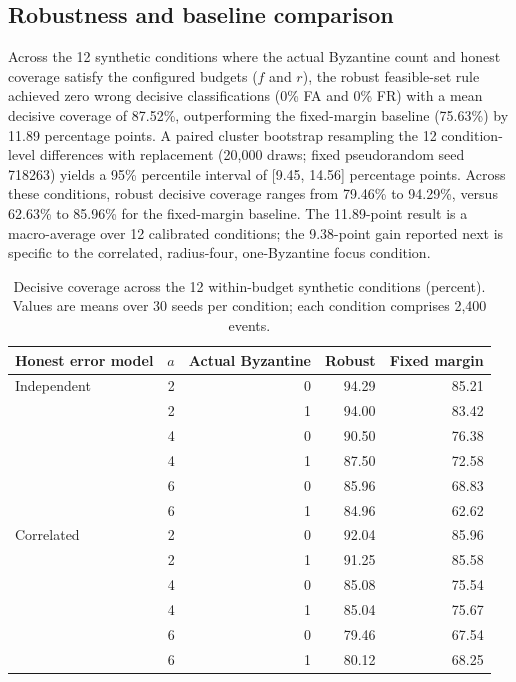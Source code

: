\documentclass[pdflatex,iicol,sn-mathphys-num]{sn-jnl}
\theoremstyle{thmstyleone}
\begin{document}
\subsection{Robustness and baseline comparison}
Across the 12 synthetic conditions where the actual Byzantine count and honest coverage satisfy the configured budgets ($f$ and $r$), the robust feasible-set rule achieved zero wrong decisive classifications (0\% FA and 0\% FR) with a mean decisive coverage of 87.52\%, outperforming the fixed-margin baseline (75.63\%) by 11.89 percentage points. A paired cluster bootstrap resampling the 12 condition-level differences with replacement (20,000 draws; fixed pseudorandom seed 718263) yields a 95\% percentile interval of [9.45, 14.56] percentage points. Across these conditions, robust decisive coverage ranges from 79.46\% to 94.29\%, versus 62.63\% to 85.96\% for the fixed-margin baseline. The 11.89-point result is a macro-average over 12 calibrated conditions; the 9.38-point gain reported next is specific to the correlated, radius-four, one-Byzantine focus condition.

\begin{table}[t]\centering\footnotesize
\caption{Decisive coverage across the 12 within-budget synthetic conditions (percent). Values are means over 30 seeds per condition; each condition comprises 2,400 events.}\label{tab:twelve}
\begin{tabular}{lrrrr}\toprule
Honest error model&$a$&Actual Byzantine&Robust&Fixed margin\\\midrule
Independent&2&0&94.29&85.21\\
&2&1&94.00&83.42\\
&4&0&90.50&76.38\\
&4&1&87.50&72.58\\
&6&0&85.96&68.83\\
&6&1&84.96&62.62\\
Correlated&2&0&92.04&85.96\\
&2&1&91.25&85.58\\
&4&0&85.08&75.54\\
&4&1&85.04&75.67\\
&6&0&79.46&67.54\\
&6&1&80.12&68.25\\
\bottomrule
\end{tabular}\end{table}
\end{document}
